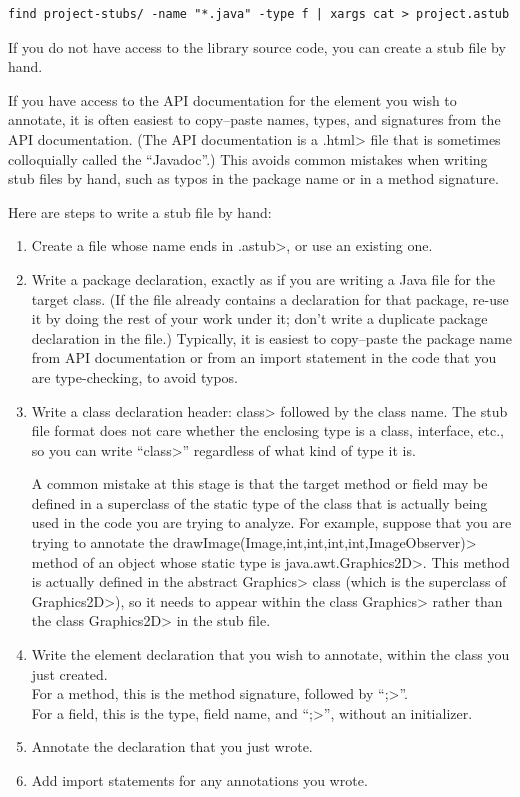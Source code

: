 \begin{Verbatim}
find project-stubs/ -name "*.java" -type f | xargs cat > project.astub
\end{Verbatim}



If you do not have access to the library source code, you can create a stub
file by hand.

If you have access to the API documentation for the element you wish to
annotate, it is often easiest to copy--paste names, types, and signatures
from the API documentation.  (The API documentation is a \<.html> file that
is sometimes colloquially called the ``Javadoc''.)  This avoids common
mistakes when writing stub files by hand, such as typos in the package name
or in a method signature.


Here are steps to write a stub file by hand:
\begin{enumerate}
\item Create a file whose name ends in \<.astub>, or use an existing one.
\item Write a package declaration, exactly as if you are
writing a Java file for the target class.  (If the file already contains a
declaration for that package, re-use it by doing the rest of your work
under it; don't write a duplicate package declaration in the file.)
Typically, it is easiest to copy--paste the package name from API
documentation or from an import statement in the code that you are
type-checking, to avoid typos.
\item Write a class declaration header:  \<class> followed by the
class name. The stub file format does not care whether the enclosing type
is a class, interface, etc., so you can write ``\<class>'' regardless of
what kind of type it is.

A common mistake at this stage is that the
target method or field may be defined in a superclass of the static type of
the class that is actually being used in the code you are trying to
analyze. For example, suppose that you are trying to annotate the
\<drawImage(Image,int,int,int,int,ImageObserver)> method of an object whose static
type is \<java.awt.Graphics2D>\@.  This method is actually defined in the abstract
\<Graphics> class (which is the superclass of \<Graphics2D>), so it needs
to appear within the class \<Graphics> rather than the class \<Graphics2D>
in the stub file.
\item Write the element declaration that you wish to annotate, within the class you just created.  \\
For a method, this is the method signature, followed by ``\<;>''. \\
For a field, this is the type, field name, and ``\<;>'', without an initializer.
\item Annotate the declaration that you just wrote.
\item Add import statements for any annotations you wrote.
\end{enumerate}

